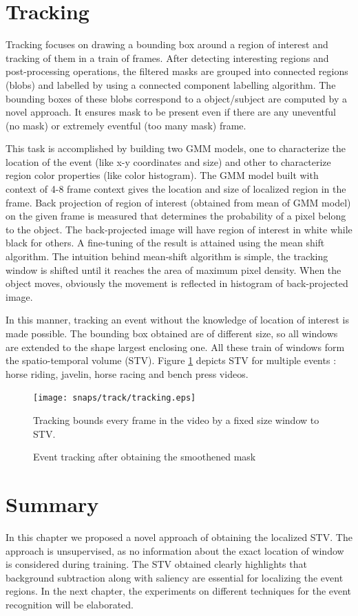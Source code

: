 \section{Tracking}
 \label{sec:trac}
Tracking focuses on drawing a bounding box around a region of interest and tracking of them in a train of frames.  After detecting interesting regions and post-processing operations, the filtered masks are grouped into connected regions (blobs) and labelled by using a connected component labelling algorithm.  The bounding boxes of these blobs correspond to a object/subject are computed by a novel approach.  It ensures mask to be present even if there are any uneventful (no mask) or extremely eventful (too many mask) frame.
\par This task is accomplished by building two GMM models, one to characterize the location of the event (like x-y coordinates and size) and other to characterize region color properties (like color histogram).  The GMM model built with context of 4-8 frame context gives the location and size of localized region in the frame.  Back projection \citep{backProj} of region of interest (obtained from mean of GMM model) on the given frame is measured that determines the probability of a pixel belong to the object.  The back-projected image  will have region of interest in white while black for others.  A fine-tuning of the result is attained using the mean shift algorithm.  The intuition behind mean-shift algorithm is simple, the tracking window is shifted until it reaches the area of maximum pixel density.  When the object moves, obviously the movement is reflected in histogram of back-projected image. 
\par In this manner, tracking an event without the knowledge of location of interest is made possible.  The bounding box obtained are of different size, so all windows are extended to the shape largest enclosing one.  All these train of  windows form the spatio-temporal volume (STV). Figure \ref{fig:tracking} depicts STV for multiple events : horse riding, javelin, horse racing and bench press videos.
\begin{figure}[htpb]
   \begin{center}
	    \texttt{[image: snaps/track/tracking.eps]}     
     \caption {Event tracking after obtaining the smoothened mask}
     \medskip \small 
     Tracking bounds every frame in the video by a fixed size window to STV.
   \label{fig:tracking}
   \end{center}
 \end{figure}
\section{Summary}
In this chapter we proposed a novel approach of obtaining the localized STV.  The approach is unsupervised, as no information about the exact location of window is considered during training.  The STV obtained clearly highlights that background subtraction along with saliency are essential for localizing the event regions. In the next chapter, the experiments on different techniques for the event recognition will be elaborated.